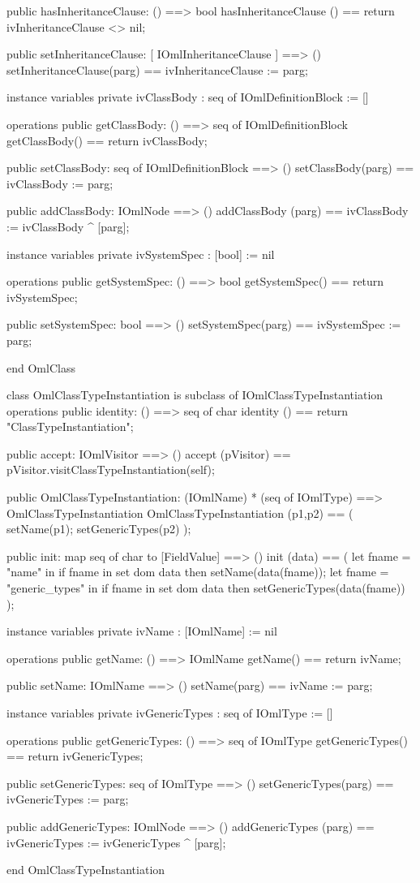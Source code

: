 \begin{vdm_al}
  public hasInheritanceClause: () ==> bool
  hasInheritanceClause () == return ivInheritanceClause <> nil;

  public setInheritanceClause: [ IOmlInheritanceClause ] ==> ()
  setInheritanceClause(parg) == ivInheritanceClause := parg;

instance variables
  private ivClassBody : seq of IOmlDefinitionBlock := []

operations
  public getClassBody: () ==> seq of IOmlDefinitionBlock
  getClassBody() == return ivClassBody;

  public setClassBody: seq of IOmlDefinitionBlock ==> ()
  setClassBody(parg) == ivClassBody := parg;

  public addClassBody: IOmlNode ==> ()
  addClassBody (parg) == ivClassBody := ivClassBody ^ [parg];

instance variables
  private ivSystemSpec : [bool] := nil

operations
  public getSystemSpec: () ==> bool
  getSystemSpec() == return ivSystemSpec;

  public setSystemSpec: bool ==> ()
  setSystemSpec(parg) == ivSystemSpec := parg;

end OmlClass
\end{vdm_al}

\begin{vdm_al}
class OmlClassTypeInstantiation is subclass of IOmlClassTypeInstantiation
operations
  public identity: () ==> seq of char
  identity () == return "ClassTypeInstantiation";

  public accept: IOmlVisitor ==> ()
  accept (pVisitor) == pVisitor.visitClassTypeInstantiation(self);

  public OmlClassTypeInstantiation:
      (IOmlName) *
      (seq of IOmlType) ==> OmlClassTypeInstantiation
  OmlClassTypeInstantiation (p1,p2) == 
   ( setName(p1);
     setGenericTypes(p2) );

  public init: map seq of char to [FieldValue] ==> ()
  init (data) ==
    ( let fname = "name" in
        if fname in set dom data
        then setName(data(fname));
      let fname = "generic_types" in
        if fname in set dom data
        then setGenericTypes(data(fname)) );

instance variables
  private ivName : [IOmlName] := nil

operations
  public getName: () ==> IOmlName
  getName() == return ivName;

  public setName: IOmlName ==> ()
  setName(parg) == ivName := parg;

instance variables
  private ivGenericTypes : seq of IOmlType := []

operations
  public getGenericTypes: () ==> seq of IOmlType
  getGenericTypes() == return ivGenericTypes;

  public setGenericTypes: seq of IOmlType ==> ()
  setGenericTypes(parg) == ivGenericTypes := parg;

  public addGenericTypes: IOmlNode ==> ()
  addGenericTypes (parg) == ivGenericTypes := ivGenericTypes ^ [parg];

end OmlClassTypeInstantiation
\end{vdm_al}

